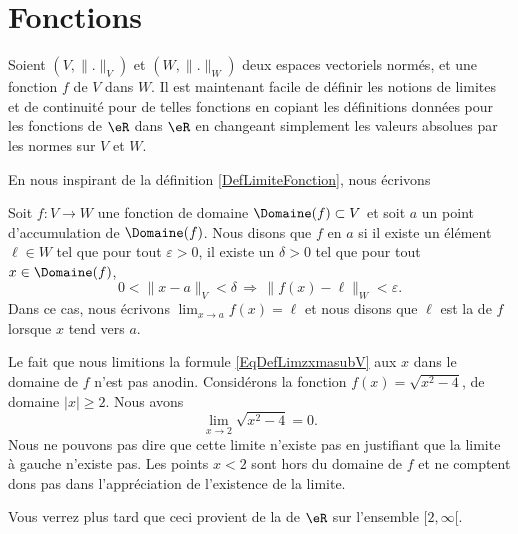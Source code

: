
\section{Fonctions}		\label{Sect_fonctions}

Soient $(V,\| . \|_V)$ et $(W,\| . \|_W)$ deux espaces vectoriels normés, et une fonction $f$ de $V$ dans $W$. Il est maintenant facile de définir les notions de limites et de continuité pour de telles fonctions en copiant les définitions données pour les fonctions de $\eR$ dans $\eR$ en changeant simplement les valeurs absolues par les normes sur $V$ et $W$.

En nous inspirant de la définition \ref{DefLimiteFonction}, nous écrivons
\begin{definition}		\label{LimiteDansEVN}
	Soit $f\colon V\to W$ une fonction de domaine \( \Domaine(f)\subset V\) et soit $a$ un point d'accumulation de $\Domaine(f)$. Nous disons que $f$  en $a$ si il existe un élément $\ell\in W$ tel que pour tout $\varepsilon>0$, il existe un $\delta>0$ tel que pour tout $x\in \Domaine(f)$,
    \begin{equation}        \label{EqDefLimzxmasubV}
		0<\| x-a \|_V<\delta\,\Rightarrow\,\| f(x)-\ell \|_W<\varepsilon.
	\end{equation}
	Dans ce cas, nous écrivons $\lim_{x\to a} f(x)=\ell$ et nous disons que $\ell$ est la  de $f$ lorsque $x$ tend vers $a$.
\end{definition}

\begin{remark}
    Le fait que nous limitions la formule \eqref{EqDefLimzxmasubV} aux \( x\) dans le domaine de \( f\) n'est pas anodin. Considérons la fonction \( f(x)=\sqrt{x^2-4}\), de domaine \( | x |\geq 2\). Nous avons
    \begin{equation}
        \lim_{x\to 2} \sqrt{x^2-4}=0.
    \end{equation}
    Nous ne pouvons pas dire que cette limite n'existe pas en justifiant que la limite à gauche n'existe pas. Les points \( x<2\) sont hors du domaine de \( f\) et ne comptent dons pas dans l'appréciation de l'existence de la limite.

    Vous verrez plus tard que ceci provient de la  de \( \eR\) sur l'ensemble \( \mathopen[ 2 , \infty [\).
\end{remark}

